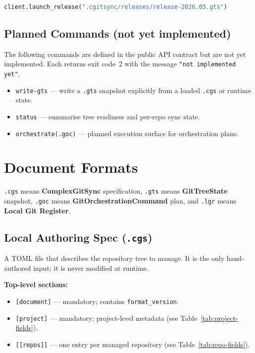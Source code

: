 \begin{lstlisting}[language=Python]
client.launch_release(".cgitsync/releases/release-2026.05.gts")
\end{lstlisting}

\subsection{Planned Commands (not yet implemented)}

The following commands are defined in the public API contract but are not yet
implemented. Each returns exit code~2 with the message
\texttt{"not implemented yet"}.

\begin{itemize}
  \item \texttt{write-gts} — write a \texttt{.gts} snapshot explicitly
    from a loaded \texttt{.cgs} or runtime state.
  \item \texttt{status} — summarise tree readiness and per-repo sync state.
  \item \texttt{orchestrate(.goc)} — planned execution surface for
    orchestration plans.
\end{itemize}

\section{Document Formats}

\texttt{.cgs} means \textbf{ComplexGitSync} specification, \texttt{.gts} means
\textbf{GitTreeState} snapshot, \texttt{.goc} means
\textbf{GitOrchestrationCommand} plan, and \texttt{.lgr} means
\textbf{Local Git Register}.

\subsection{Local Authoring Spec (\texttt{.cgs})}

A TOML file that describes the repository tree to manage. It is the only
hand-authored input; it is never modified at runtime.

\textbf{Top-level sections:}

\begin{itemize}
  \item \texttt{[document]} — mandatory; contains \texttt{format\_version}.
  \item \texttt{[project]} — mandatory; project-level metadata (see
        Table~\ref{tab:project-fields}).
  \item \texttt{[[repos]]} — one entry per managed repository
        (see Table~\ref{tab:repo-fields}).
\end{itemize}

